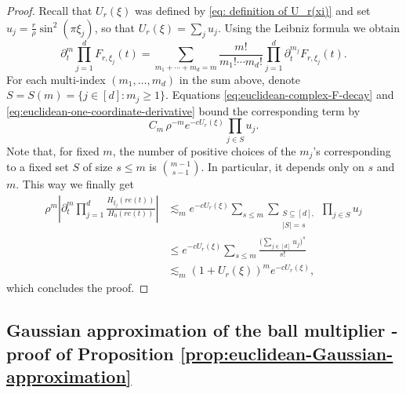 \documentclass{article}
\theoremstyle{plain}
\numberwithin{equation}{section}
\begin{document}
\begin{proof}
Recall that $U_r(\xi)$ was defined by \eqref{eq: definition of U_r(xi)} and set $u_j= \frac{r}{\rho}\sin^2(\pi\xi_j)$, so that
$U_r(\xi)=\sum_j u_j$.  Using the Leibniz formula we obtain
\[
 \partial_t^m\prod_{j=1}^dF_{r,\xi_j}(t)
 =\sum_{m_1+\cdots+m_d=m}
 \frac{m!}{m_1!\cdots m_d!}
 \prod_{j=1}^d\partial_t^{m_j}F_{r,\xi_j}(t).
\]
For each multi-index \((m_1,\ldots,m_d)\) in the sum above, denote
\(S=S(m)=\{j\in[d]:m_j\geq1\}\).  Equations \eqref{eq:euclidean-complex-F-decay} and
\eqref{eq:euclidean-one-coordinate-derivative} bound the corresponding term by
\[
 C_m\,\rho^{-m}e^{-cU_r(\xi)}\prod_{j\in S}u_j.
\]
 Note that, for fixed \(m\), the number of positive choices of the \(m_j\)'s corresponding to a fixed set \(S\) of size \(s\le m\) is \(\binom{m-1}{s-1}\). In particular, it depends only on \(s\) and \(m\). This way we finally get
\begin{align*}
    \rho^m\left|
 \partial_t^m
 \prod_{j=1}^d\frac{H_{\xi_j}(re(t))}{H_0(re(t))}
 \right|
 &\lesssim_m e^{-cU_r(\xi)} \sum_{s \le m} \sum_{\substack{S\subseteq [d], \\ |S|=s}} \prod_{j\in S}u_j \\
 & \le e^{-cU_r(\xi)} \sum_{s \le m} \frac{\big(\sum_{j\in [d]} u_j \big)^s}{s!} \\
 &\lesssim_m (1+U_r(\xi))^m e^{-c U_r(\xi)},
\end{align*}
which concludes the proof.
\end{proof}

\subsection{ Gaussian approximation of the ball multiplier - proof of Proposition \ref{prop:euclidean-Gaussian-approximation}}
\end{document}
